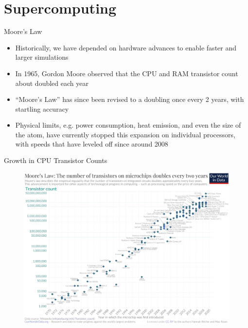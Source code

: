 \section{Supercomputing}

\begin{frame}{Moore's Law}
\begin{itemize}
\item Historically, we have depended on hardware advances to enable faster and
      larger simulations
\item In 1965, Gordon Moore observed that the CPU and RAM transistor count
      about doubled each year
\item ``Moore’s Law'' has since been revised to a doubling once every 2 years,
      with startling accuracy
\item Physical limits, e.g. power consumption, heat emission, and even the size
      of the atom, have currently stopped this expansion on individual processors,
      with speeds that have leveled off since around 2008
\end{itemize}
\end{frame}

\begin{frame}{Growth in CPU Transistor Counts}
\begin{figure}
  \centering
  \includegraphics[width=0.65\linewidth]{figures/cpu_transistor_counts.png}
\end{figure}
\end{frame}


